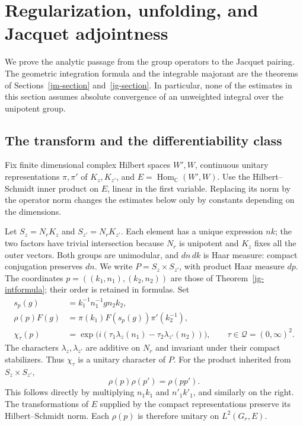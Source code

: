 \section{Regularization, unfolding, and Jacquet adjointness}
\label{jp-section}

We prove the analytic passage from the group operators to the
Jacquet pairing.  The geometric integration formula and the
integrable majorant are the theorems of
Sections~\ref{jm-section} and~\ref{jg-section}.
In particular, none of the estimates in this section assumes
absolute convergence of an unweighted integral over the
unipotent group.

\subsection{The transform and the differentiability class}

Fix finite dimensional complex Hilbert spaces \(W',W\), continuous
unitary representations \(\pi,\pi'\) of \(K_z,K_{z'}\), and
\(E=\operatorname{Hom}_{\mathbb C}(W',W)\).
Use the Hilbert--Schmidt inner product on \(E\), linear in the
first variable.  Replacing its norm by the operator norm changes
the estimates below only by constants depending on the dimensions.

Let \(S_z=N_rK_z\) and \(S_{z'}=N_rK_{z'}\).
Each element has a unique expression \(nk\); the two factors have
trivial intersection because \(N_r\) is unipotent and \(K_z\)
fixes all the outer vectors.  Both groups are unimodular, and
\(dn\,dk\) is Haar measure: compact conjugation preserves \(dn\).
We write \(P=S_z\times S_{z'}\), with product Haar measure \(dp\).
The coordinates \(p=((k_1,n_1),(k_2,n_2))\) are those of
Theorem~\ref{jg-intformula}; their order is retained in formulas.
Set
\[
 \begin{split}
 s_p(g)&=k_1^{-1}n_1^{-1}g n_2k_2,\\
 \rho(p)F(g)&=\pi(k_1)F(s_p(g))\pi'(k_2^{-1}),\\
 \chi_\tau(p)&=\exp\!\bigl(i(\tau_1\lambda_z(n_1)
                              -\tau_2\lambda_{z'}(n_2))\bigr),
                 \qquad \tau\in\mathcal Q=(0,\infty)^2 .
 \end{split}
\]
The characters \(\lambda_z,\lambda_{z'}\) are additive on \(N_r\)
and invariant under their compact stabilizers.  Thus \(\chi_\tau\)
is a unitary character of \(P\).
For the product inherited from \(S_z\times S_{z'}\),
\[
                       \rho(p)\rho(p')=\rho(pp').
\]
This follows directly by multiplying \(n_1k_1\) and \(n'_1k'_1\),
and similarly on the right.  The transformations of \(E\) supplied
by the compact representations preserve its Hilbert--Schmidt norm.
Each \(\rho(p)\) is therefore unitary on \(L^2(G_r,E)\).

